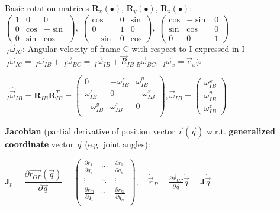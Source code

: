 \documentclass[fontsize=6pt]{scrartcl}
\newcommand{\mat}[1]{\mathbf{#1}}
\begin{document}
\begin{multicols*}{4}
 Basic rotation matrices $\mat R_x(\bullet)$, $\mat R_y(\bullet)$, $\mat R_z(\bullet)$:
$
	\begin{pmatrix}
	1 & 0 & 0 \\
	0 & \cos  & -\sin \\
	0 & \sin  & \cos
	\end{pmatrix},\;
	\begin{pmatrix}
	\cos  & 0 & \sin \\
	0 & 1 & 0 \\
	-\sin & 0 & \cos
	\end{pmatrix},\;
	\begin{pmatrix}
	\cos & -\sin & 0 \\
	\sin & \cos & 0 \\
	0 & 0 & 1
	\end{pmatrix}
$\\
$ ~_I \vec \omega_{IC} $: Angular velocity of frame C with respect to I expressed in I\\
$ ~_I \vec \omega_{IC} =  ~_I \vec \omega_{IB} + ~_I \vec \omega_{BC} = ~_I \vec \omega_{IB} + \vec R_{IB} ~_B \vec \omega_{BC}$,
$ ~_I \vec{\omega}_x = \vec{e}_x \dot\varphi $

$ ~_I\hat{\vec \omega}_{IB} = \dot{\mat{R}}_{IB} \mat R_{IB}^T =
\begin{pmatrix}
0 & -\omega_{IB}^z & \omega_{IB}^y\\
\omega_{IB}^z & 0 & -\omega_{IB}^x\\
-\omega_{IB}^y & \omega_{IB}^x & 0\\
\end{pmatrix},
\vec{\omega}_{IB}=
\begin{pmatrix}
\omega_{IB}^x\\
\omega_{IB}^y\\
\omega_{IB}^z
\end{pmatrix}
$

\textbf{Jacobian} (partial derivative of position vector $\vec{r}(\vec
q)$ w.r.t. \textbf{generalized coordinate} vector $\vec{q}$ (e.g. joint angles):

	$
	\mat J_p
	=
	\dfrac{\partial \vec{r_{OP}}(\vec q)}{\partial \vec q}
	=
	\begin{pmatrix}
	\frac{\partial r_1}{\partial q_1} & \cdots & \frac{\partial r_1}{\partial
		q_n} \\
	\vdots & \ddots & \vdots \\
	\frac{\partial r_m}{\partial q_1} & \cdots & \frac{\partial r_m}{\partial
		q_n} \\
	\end{pmatrix},
	\quad  \dot{\vec{r}}_P = \frac{\partial \vec r_{OP}}{\partial \vec q} \dot{\vec{q}} = \mat J \dot{\vec{q}} $


\end{multicols*}
\end{document}
